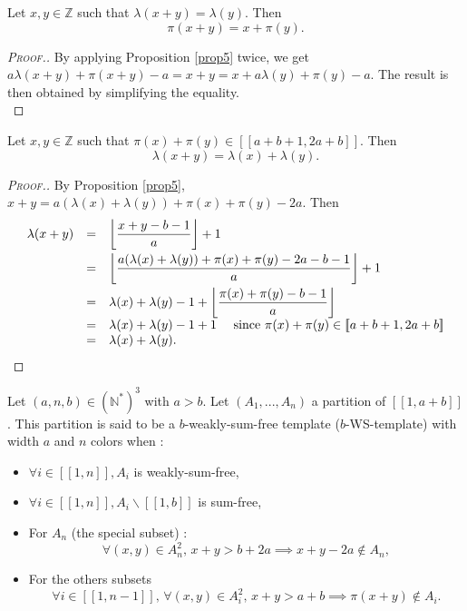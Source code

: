 \begin{proposition}
\label{prop6}
Let \(x, y \in \mathbb{Z}\) such that \(\lambda(x + y) = \lambda(y)\). Then
\[
\pi(x + y) = x + \pi(y).
\]
\end{proposition}

\begin{proof}[\textsc{Proof.}]
By applying Proposition \ref{prop5} twice, we get \(a \lambda(x + y) + \pi(x + y) - a = x + y = x + a \lambda(y) + \pi(y) - a\).
The result is then obtained by simplifying the equality. \\
\end{proof}

\begin{proposition}
\label{prop7}
Let \(x, y \in \mathbb{Z}\) such that \(\pi(x) + \pi(y) \in [\![a + b + 1, 2 a + b]\!]\). Then
\[
\lambda(x + y) = \lambda(x) + \lambda(y).
\]
\end{proposition}

\begin{proof}[\textsc{Proof.}]
By Proposition \ref{prop5}, \(x + y = a (\lambda(x) + \lambda(y)) + \pi(x) + \pi(y) - 2 a\). Then
\[
\begin{array}{l l l}
	\lambda(x + y) & = & \left \lfloor \dfrac{x + y - b - 1}{a} \right \rfloor + 1 \vspace{1mm} \\
	 & = & \left \lfloor \dfrac{a (\lambda(x) + \lambda(y)) + \pi(x) + \pi(y) - 2 a - b - 1}{a} \right \rfloor + 1 \vspace{1mm} \\
	 & = & \lambda(x) + \lambda(y) - 1 + \left \lfloor \dfrac{\pi(x) + \pi(y) - b - 1}{a}\right\rfloor \\
	 & = & \lambda(x)+\lambda(y) -1 +1 ~~~~\text{since } \pi(x) + \pi(y) \in [\![a + b + 1, 2 a + b]\!] \\
	 & =& \lambda(x)+\lambda(y).
\end{array}
\]
\end{proof}

\begin{definition}
Let \( (a,n,b) \in (\mathbb{N}^*)^3\) with \(a > b\). Let \((A_1,...,A_n)\) a partition of  \([\![1, a + b]\!]\).
This partition is said to be a \(b\)-weakly-sum-free template (\(b\)-WS-template) with width \(a\) and \(n\) colors when :

\begin{itemize}
\item \(\forall i \in [\![1, n]\!], A_i\) is weakly-sum-free,
\item \(\forall i \in [\![1, n]\!], A_i\backslash [\![1, b]\!]\) is sum-free,
\item For \(A_n\) (the special subset) :
	\[
	\forall (x,y) \in A_n^2, \,x+y>b+2a \implies x+y-2a\notin A_n,
	\]
\item For the others subsets
	\[
	\forall i \in [\![1,n-1]\!], \, \forall(x,y) \in A_i^2, \, x+y>a+b \implies \pi(x+y) \notin A_i.
	\]
\end{itemize}
\end{definition}


